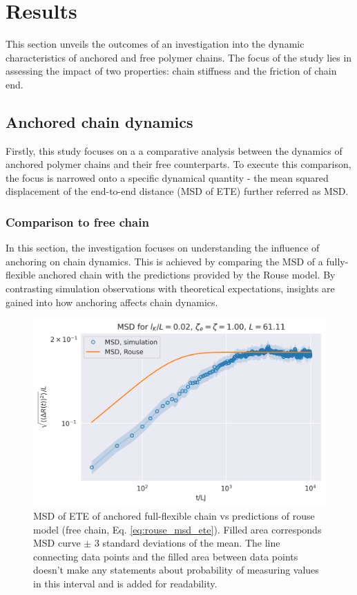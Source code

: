 \documentclass[
    paper=A4,pagesize=automedia,fontsize=12pt,
    BCOR=15mm,DIV=22,
    twoside,headinclude,footinclude=false,
    ngerman,fleqn,             %
    bibliography=totocnumbered,          %
    listof=totoc,                %
    listof=flat,                 %
    cleardoublepage=empty      %
    numbers=endperiod
]{scrartcl}
\begin{document}
\section{Results}
This section unveils the outcomes of an investigation into the dynamic
characteristics of anchored and free polymer chains. 
The focus of the study lies in assessing the impact 
of two properties: chain stiffness and the friction of chain end.

\subsection{Anchored chain dynamics}
Firstly, this study focuses on a a comparative analysis between the 
dynamics of anchored polymer chains and their free counterparts.
To execute this comparison, the focus is narrowed onto a specific dynamical
quantity - the mean squared displacement of the end-to-end distance (MSD of ETE)
further referred as MSD.

\subsubsection{Comparison to free chain}

In this section, the investigation focuses on understanding 
the influence of anchoring on chain dynamics. 
This is achieved by comparing the MSD of a fully-flexible anchored 
chain with the predictions provided by the Rouse model. 
By contrasting simulation observations with theoretical
expectations, insights are gained into how anchoring 
affects chain dynamics.

\begin{figure}[h]
    \begin{center}
      \includegraphics[width=\columnwidth,trim={0cm 0cm 0cm 0.9cm},clip]{3-exp-fixed-param-log.png}
      \caption{\label{fig:anchored_flex_chain_vs_rouse}
      MSD of ETE of anchored full-flexible chain vs predictions of rouse model (free chain, Eq. \ref{eq:rouse_msd_ete}).
      Filled area corresponds MSD curve $\pm$ 3 standard deviations of the mean. The
      line connecting data points and the filled area between data points doesn't make
      any statements about probability of measuring values in this interval and is
      added for readability.
      }
    \end{center}
\end{figure}
\end{document}
